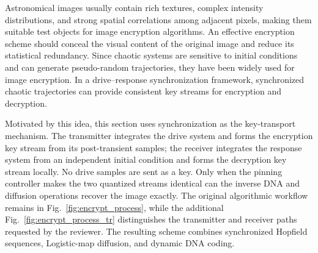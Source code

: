 \documentclass[10pt,twocolumn]{article}
\newcommand{\rev}[1]{{\color{revisionblue}#1}}
\theoremstyle{definition}
\begin{document}
Astronomical images usually contain rich textures, complex intensity distributions, and strong spatial correlations among adjacent pixels, making them suitable test objects for image encryption algorithms. An effective encryption scheme should conceal the visual content of the original image and reduce its statistical redundancy. Since chaotic systems are sensitive to initial conditions and can generate pseudo-random trajectories, they have been widely used for image encryption. In a drive--response synchronization framework, synchronized chaotic trajectories can provide consistent key streams for encryption and decryption.

\rev{Motivated by this idea, this section uses synchronization as the key-transport mechanism. The transmitter integrates the drive system and forms the encryption key stream from its post-transient samples; the receiver integrates the response system from an independent initial condition and forms the decryption key stream locally. No drive samples are sent as a key. Only when the pinning controller makes the two quantized streams identical can the inverse DNA and diffusion operations recover the image exactly. The original algorithmic workflow remains in Fig.~\ref{fig:encrypt_process}, while the additional Fig.~\ref{fig:encrypt_process_tr} distinguishes the transmitter and receiver paths requested by the reviewer. The resulting scheme combines synchronized Hopfield sequences, Logistic-map diffusion, and dynamic DNA coding.}
\end{document}
